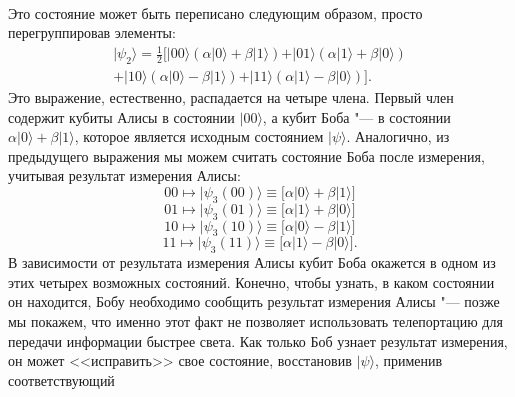 \begin{multicols}{2}
{\begin{equation}
\begin{split}
            \end{split}
        \end{equation}
        Это состояние может быть переписано следующим образом, просто перегруппировав элементы:
        \begin{equation}
            \begin{split}
                \vert\psi_{2}\rangle=\frac{1}{2}\big[\vert00\rangle(\alpha\vert0\rangle+\beta\vert1\rangle)+\vert01\rangle(\alpha\vert1\rangle+\beta\vert0\rangle)\\
                +\vert10\rangle(\alpha\vert0\rangle-\beta\vert1\rangle)+\vert11\rangle(\alpha\vert1\rangle-\beta\vert0\rangle)\big].            \end{split}
        \end{equation}
        Это выражение, естественно, распадается на четыре члена. Первый член содержит кубиты Алисы
        в состоянии $\vert00\rangle$, а кубит Боба "--- в состоянии $\alpha\vert0\rangle+\beta\vert1\rangle$, которое является исходным состоянием
        $\vert\psi\rangle$.  Аналогично, из предыдущего выражения мы можем считать состояние Боба после измерения, учитывая результат измерения Алисы:
        \begin{equation}
            00\longmapsto \vert\psi_{3}(00)\rangle\equiv\big[\alpha\vert0\rangle+\beta\vert1\rangle\big]
        \end{equation}
        \begin{equation}
            01\longmapsto \vert\psi_{3}(01)\rangle\equiv\big[\alpha\vert1\rangle+\beta\vert0\rangle\big]
        \end{equation}
        \begin{equation}
            10\longmapsto \vert\psi_{3}(10)\rangle\equiv\big[\alpha\vert0\rangle-\beta\vert1\rangle\big]
        \end{equation}
        \begin{equation}
            11\longmapsto \vert\psi_{3}(11)\rangle\equiv\big[\alpha\vert1\rangle-\beta\vert0\rangle\big].
        \end{equation}
        В зависимости от результата измерения Алисы кубит Боба окажется в одном из этих
        четырех возможных состояний. Конечно, чтобы узнать, в каком состоянии он находится, Бобу необходимо сообщить результат
        измерения Алисы "--- позже мы покажем, что именно этот факт не позволяет использовать телепортацию для передачи информации быстрее света.
        Как только Боб узнает результат измерения, он может <<исправить>> свое состояние, восстановив $\vert\psi\rangle$, применив соответствующий
}
\end{multicols}

